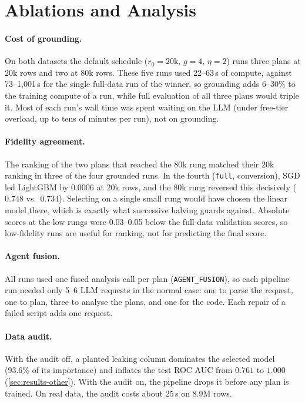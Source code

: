 \section{Ablations and Analysis}
\label{sec:ablations}

\paragraph{Cost of grounding.} On both datasets the default schedule ($r_0 = 20$k, $g = 4$, $\eta = 2$) runs three plans at 20k rows and two at 80k rows. These five runs used 22--63\,s of compute, against 73--1{,}001\,s for the single full-data run of the winner, so grounding adds 6--30\% to the training compute of a run, while full evaluation of all three plans would triple it. Most of each run's wall time was spent waiting on the LLM (under free-tier overload, up to tens of minutes per run), not on grounding.

\paragraph{Fidelity agreement.} The ranking of the two plans that reached the 80k rung matched their 20k ranking in three of the four grounded runs. In the fourth (\texttt{full}, conversion), SGD led LightGBM by $0.0006$ at 20k rows, and the 80k rung reversed this decisively ($0.748$ vs.\ $0.734$). Selecting on a single small rung would have chosen the linear model there, which is exactly what successive halving guards against. Absolute scores at the low rungs were 0.03--0.05 below the full-data validation scores, so low-fidelity runs are useful for ranking, not for predicting the final score.

\paragraph{Agent fusion.} All runs used one fused analysis call per plan (\texttt{AGENT\_FUSION}), so each pipeline run needed only 5--6 LLM requests in the normal case: one to parse the request, one to plan, three to analyse the plans, and one for the code. Each repair of a failed script adds one request.

\paragraph{Data audit.} With the audit off, a planted leaking column dominates the selected model (93.6\% of its importance) and inflates the test ROC AUC from $0.761$ to $1.000$ (\cref{sec:results-other}). With the audit on, the pipeline drops it before any plan is trained. On real data, the audit costs about 25\,s on 8.9M rows.


